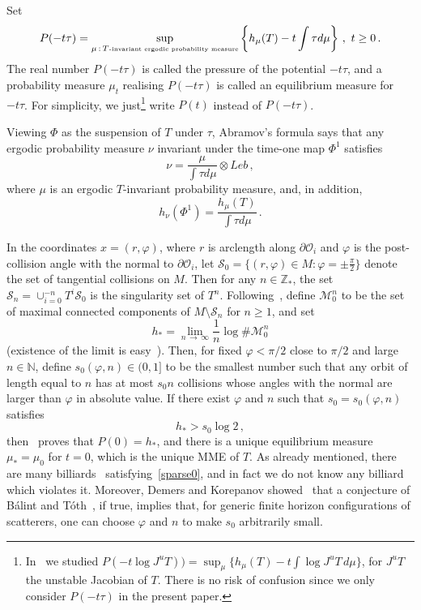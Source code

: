 \documentclass[10pt]{amsart}
\theoremstyle{definition}\newtheorem{defi}[theo]{Definition}\newtheorem{rema}[theo]{Remark}\newtheorem{exam}[theo]{Example}\newtheorem{exem}[theo]{Example}\newtheorem{nota}[theo]{Notation}
\newcommand{\MM}{\mathcal{M}}
\newcommand{\OO}{\mathcal{O}}
\newcommand{\cS}{\mathcal{S}}
\newcommand{\bbN}{\mathbb{N}}
\newcommand{\bbZ}{\mathbb{Z}}
\newcommand{\vf}{\varphi}
\begin{document}
Set
\[
P(-t\tau)=\sup_{\mu\,:\,T\text{\tiny{-invariant ergodic probability measure}}}
\left\{h_\mu(T)-t \int \tau d \mu \right\} \,, \,\,t\ge 0\,.
\]
The real number $P(-t \tau)$ is called the pressure of the potential $-t\tau$, and a probability measure $\mu_t$ realising $P(-t \tau)$ is called an equilibrium measure for $-t\tau$. For simplicity, we just\footnote{In~\cite{BD2} we studied $P(-t\log J^u T))=\sup_\mu \{h_\mu(T)-t \int \log J^u T \, d \mu \} $, for $J^uT$ the unstable Jacobian of $T$. There is no risk of confusion since we only consider $P(-t\tau)$ in the present paper.} write $P(t)$ instead of $P(-t\tau)$.

Viewing $\Phi$ as the suspension of $T$ under $\tau$, Abramov's formula says that any ergodic probability measure $\nu$ invariant under the time-one map $\Phi^1$ satisfies
\begin{equation}\label{Abr0}
\nu=\frac{\mu}{\int \tau d \mu} \otimes Leb\,,
\end{equation}
where $\mu$ is an ergodic $T$-invariant probability measure, and, in addition,
\begin{equation}\label{Abr}
h_\nu(\Phi ^1) =\frac{h_\mu(T)}{\int \tau d \mu} \,.
\end{equation}


In the coordinates $x = (r,\vf)$, where $r$ is arclength along $\partial \OO_i$ and $\vf$ is the post-collision angle with the normal to $\partial \OO_i$, let $\cS_0 = \{ (r, \vf) \in M: \vf = \pm \frac{\pi}{2} \}$ denote the set of tangential collisions on $M$. Then for any $n\in \bbZ_*$, the set $
\cS_n = \cup_{i=0}^{-n} T^i\cS_0$ is the singularity set of $T^n$. Following~\cite{BD1}, define $\MM_0^n$ to be the set of maximal connected components of $M \setminus \cS_n$ for $n\ge 1$, and set
\begin{equation}\label{defh}
h_*=\lim_{n\,\to\,\infty} \frac 1 n \log \# \MM_0^n
\end{equation}
(existence of the limit is easy~\cite{BD1}). Then, for fixed $\vf<\pi/2$ close to $\pi/2$ and large $n \in \bbN$, define $s_0(\vf,n) \in (0,1]$ to be the smallest number such that any orbit of length equal to $n$ has at most $s_0n$ collisions whose angles with the normal are larger than $\vf$ in absolute value. If there exist $\varphi$ and $n$ such that $s_0 = s_0(\vf,n)$ satisfies
\begin{equation}\label{sparse0}
h_*> s_0\log 2 \,,
\end{equation}
then~\cite{BD1} proves that $P(0)=h_*$, and there is a unique equilibrium measure $\mu_*=\mu_0$ for $t=0$, which is the unique MME of $T$. As already mentioned, there are many billiards~\cite[\S~2.4]{BD1} satisfying~\eqref{sparse0}, and in fact we do not know any billiard which violates it. Moreover, Demers and Korepanov showed~\cite{DK} that a conjecture of Bálint and Tóth~\cite{balint-toth}, if true, implies that, for generic finite horizon configurations of scatterers, one can choose $\vf$ and $n$ to make $s_0$ arbitrarily small.
\end{document}
